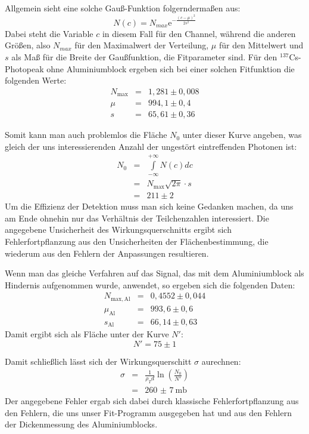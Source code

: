 Allgemein sieht eine solche Gauß-Funktion folgerndermaßen aus:
\begin{equation}
  N(c) = N_{max}\mathrm e^{-\frac{(c-\mu)^2}{2s^2}}
\end{equation}
Dabei steht die Variable $c$ in diesem Fall für den Channel, während die
anderen Größen, also $N_{max}$ für den Maximalwert der Verteilung, $\mu$ für den
Mittelwert und $s$ als Maß für die Breite der Gaußfunktion, die Fitparameter
sind. Für den $^{137}$Cs-Photopeak ohne Aluminiumblock ergeben sich bei einer
solchen Fitfunktion die folgenden Werte:
\begin{eqnarray}
N_{\mathrm{max}} &=& 1,281 \pm 0,008\\
\mu &=& 994,1 \pm 0,4\\
s &=& 65,61 \pm 0,36
\end{eqnarray}

Somit kann man auch problemlos die Fläche $N_0$ unter dieser Kurve
angeben, was gleich der uns interessierenden Anzahl der ungestört eintreffenden
Photonen ist:
\begin{eqnarray}
N_0 &=& \int\limits_{-\infty}^{+\infty}N(c)dc\\
&=& N_{\mathrm{max}}\sqrt{2\pi}\cdot s\\
\nonumber &=& 211 \pm 2
\end{eqnarray}
Um die Effizienz der Detektion muss man sich keine Gedanken machen, da uns am
Ende ohnehin nur das Verhältnis der Teilchenzahlen interessiert.
Die angegebene Unsicherheit des Wirkungsquerschnitts ergibt sich Fehlerfortpflanzung
aus den Unsicherheiten der Flächenbestimmung, die wiederum aus den Fehlern der
Anpassungen resultieren.

Wenn man das gleiche Verfahren auf das Signal, das mit dem Aluminiumblock als
Hindernis aufgenommen wurde, anwendet, so ergeben sich die folgenden Daten:
\begin{eqnarray}
N_{\mathrm{max, Al}} &=& 0,4552 \pm 0,044\\
\mu_{\mathrm{Al}} &=& 993,6 \pm 0,6\\
s_{\mathrm{Al}} &=& 66,14 \pm 0,63
\end{eqnarray}
Damit ergibt sich als Fläche unter der Kurve $N'$:
\begin{equation}
N' = 75 \pm 1
\end{equation}

Damit schließlich lässt sich der Wirkungsquerschitt $\sigma$ aurechnen:
\begin{eqnarray}
\sigma &=& \frac{1}{\rho_T d}\ln\left(\frac{N_0}{N'}\right)\\
\nonumber &=& \SI{260(7)}{\milli\barn}
\end{eqnarray}
Der angegebene Fehler ergab sich dabei durch klassische Fehlerfortpflanzung
aus den Fehlern, die uns unser Fit-Programm ausgegeben hat und aus den Fehlern der
Dickenmessung des Aluminiumblocks.

